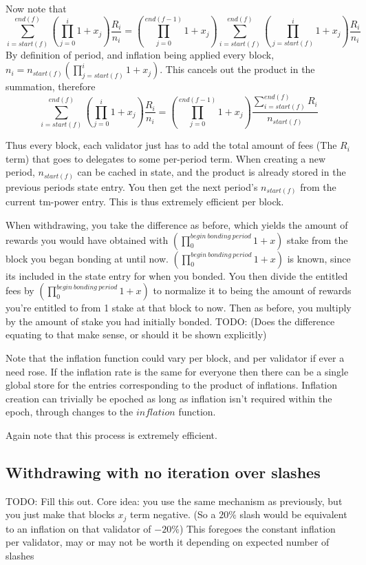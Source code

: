 \documentclass[]{article}
\begin{document}
Now note that 
$$\sum_{i = start(f)}^{end(f)}\left(\prod_{j = 0}^{i} 1 + x_j \right) \frac{R_i}{n_i} = \left(\prod_{j = 0}^{end(f - 1)} 1 + x_j \right)\sum_{i = start(f)}^{end(f)}\left(\prod_{j = start(f)}^{i} 1 + x_j \right) \frac{R_i}{n_i}$$
By definition of period, and inflation being applied every block, \\
$n_i = n_{start(f)}\left(\prod_{j = start(f)}^{i} 1 + x_j \right)$. This cancels out the product in the summation, therefore
$$\sum_{i = start(f)}^{end(f)}\left(\prod_{j = 0}^{i} 1 + x_j \right) \frac{R_i}{n_i} = \left(\prod_{j = 0}^{end(f - 1)} 1 + x_j \right)\frac{\sum_{i = start(f)}^{end(f)}R_i}{n_{start(f)}}$$

Thus every block, each validator just has to add the total amount of fees (The $R_i$ term) that goes to delegates to some per-period term.
When creating a new period, $n_{start(f)}$ can be cached in state, and the product is already stored in the previous periods state entry.
You then get the next period's $n_{start(f)}$ from the current tm-power entry. 
This is thus extremely efficient per block.

When withdrawing, you take the difference as before,
which yields the amount of rewards you would have obtained with $(\prod_0^{begin\ bonding\ period}1 + x)$ stake from the block you began bonding at until now.
$(\prod_0^{begin\ bonding\ period}1 + x)$ is known, since its included in the state entry for when you bonded.
You then divide the entitled fees by $(\prod_0^{begin\ bonding\ period}1 + x)$ to normalize it to being the amount of rewards you're entitled to from 1 stake at that block to now.
Then as before, you multiply by the amount of stake you had initially bonded.
TODO: (Does the difference equating to that make sense, or should it be shown explicitly)

Note that the inflation function could vary per block,
and per validator if ever a need rose. 
If the inflation rate is the same for everyone then there can be a single global store for the entries corresponding to the product of inflations.
Inflation creation can trivially be epoched as long as inflation isn't required within the epoch, through changes to the $inflation$ function.

Again note that this process is extremely efficient.

\subsection{Withdrawing with no iteration over slashes}
TODO: Fill this out. 
Core idea: you use the same mechanism as previously, but you just make that blocks $x_j$ term negative.
(So a $20\%$ slash would be equivalent to an inflation on that validator of $-20\%$)
This foregoes the constant inflation per validator, may or may not be worth it depending on expected number of slashes
\end{document}
